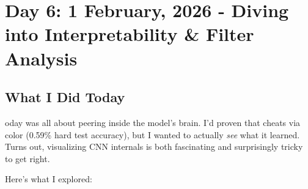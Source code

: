 \documentclass[9pt,a4paper,twocolumn,twoside]{tau-class/tau}
\begin{document}

\section{Day 6: 1 February, 2026 - Diving into Interpretability \& Filter Analysis}

    \subsection{What I Did Today}

        oday was all about peering inside the model's brain. I'd proven that  cheats via color (0.59\% hard test accuracy), but I wanted to actually \textit{see} what it learned. Turns out, visualizing CNN internals is both fascinating and surprisingly tricky to get right.

        Here's what I explored:
\end{document}
